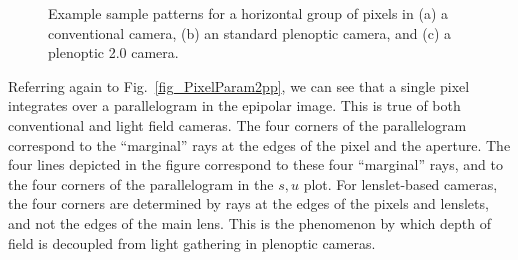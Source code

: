 \documentclass[onecolumn]{article}
\begin{document}
\begin{figure}
	\centering
	 \hfil
	 \hfil
	\caption{Example sample patterns for a horizontal group of pixels in (a) a conventional camera, (b) an standard plenoptic camera, and (c) a plenoptic 2.0 camera.}
	\label{fig_SampPatIntro}
\end{figure}

Referring again to Fig.~\ref{fig_PixelParam2pp}, we can see that a single pixel integrates over a parallelogram in the epipolar image.  This is true of both conventional and light field cameras.  The four corners of the parallelogram correspond to the ``marginal'' rays at the edges of the pixel and the aperture.  The four lines depicted in the figure correspond to these four ``marginal'' rays, and to the four corners of the parallelogram in the $s,u$ plot.  For lenslet-based cameras, the four corners are determined by rays at the edges of the pixels and lenslets, and not the edges of the main lens.  This is the phenomenon by which depth of field is decoupled from light gathering in plenoptic cameras.
\end{document}
